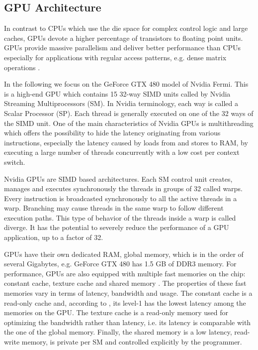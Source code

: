 \subsection{GPU Architecture}

In contrast to CPUs which use the die space for complex control logic and large
caches, GPUs devote a higher percentage of transistors to floating point units.
GPUs provide massive parallelism and deliver better performance than CPUs
especially for applications with regular access patterns, e.g. dense matrix
operations \cite{volkov2008}.

In the following we focus on the GeForce GTX 480 model of Nvidia Fermi.
This is a high-end GPU which contains 15 32-way SIMD units called by Nvidia
Streaming Multiprocessors (SM). In Nvidia terminology, each way is called a
Scalar Processor (SP). Each thread is generally executed on one of the 32 ways
of the SIMD unit. One of the main characteristics of Nvidia GPUs is multithreading
which offers the possibility to hide the latency originating from various
instructions, especially the latency caused by loads from and stores to RAM, by
executing a large number of threads concurrently with a low cost per context
switch.

Nvidia GPUs are SIMD based architectures. Each SM control unit creates, manages
and executes synchronously the threads in groups of 32 called warps. Every
instruction is broadcasted synchronously to all the active threads in a warp.
Branching may cause threads in the same warp to follow different execution
paths. This type of behavior of the threads inside a warp is called diverge. It
has the potential to severely reduce the performance of a GPU application, up to
a factor of 32.

GPUs have their own dedicated RAM, global memory, which is in the order of
several Gigabytes, e.g. GeForce GTX 480 has 1.5 GB of DDR3 memory. For
performance, GPUs are also equipped with multiple fast memories on the chip:
constant cache, texture cache and shared memory \cite{ryo2008}. The properties
of these fast memories vary in terms of latency, bandwidth and usage. The
constant cache is a read-only cache and, according to \cite{won2010}, its
level-1 has the lowest latency among the memories on the GPU. The texture cache
is a read-only memory used for optimizing the bandwidth rather than latency,
i.e. its latency is comparable with the one of the global memory. Finally, the
shared memory is a low latency, read-write memory, is private per SM and
controlled explicitly by the programmer.


